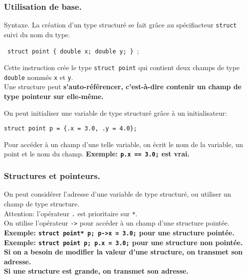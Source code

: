 \documentclass[french, 11pt]{article}
\begin{document}
\subsubsection{Utilisation de base.}

\begin{defi}{Syntaxe.}{}
    La création d'un type structuré se fait grâce au spécifiacteur \texttt{struct} suivi du nom du type.
    \begin{center}
        \texttt{
            struct point \{
                double x;
                double y;
            \}
        };
    \end{center}
    Cette instruction crée le type \texttt{struct point} qui contient deux champs de type \texttt{double} nommés \texttt{x} et \texttt{y}.\\
    Une structure peut \bf{s'auto-référencer}, c'est-à-dire contenir un champ de type pointeur sur elle-même.
\end{defi}

\begin{defi}{}{}
    On peut initialiser une variable de type structuré grâce à un initialisateur:
    \begin{center}
        \texttt{struct point p = \{.x = 3.0, .y = 4.0\};}
    \end{center}
    Pour accéder à un champ d'une telle variable, on écrit le nom de la variable, un point et le nom du champ.\n
    \bf{Exemple:} \texttt{p.x == 3.0;} est vrai.
\end{defi}

\subsubsection{Structures et pointeurs.}

\begin{defi}{}{}
    On peut considérer l'adresse d'une variable de type structuré, ou utiliser un champ de type structure.\\
    Attention: l'opérateur \texttt{.} est prioritaire sur \texttt{*}.\\
    On utilise l'opérateur \texttt{->} pour accéder à un champ d'une structure pointée.\n
    \bf{Exemple:} \texttt{struct point* p; p->x = 3.0;} pour une structure pointée.\\
    \bf{Exemple:} \texttt{struct point p; p.x = 3.0;} pour une structure non pointée.\n
    Si on a besoin de modifier la valeur d'une structure, on transmet son adresse.\\
    Si une structure est grande, on transmet son adresse.
\end{defi}
\end{document}
